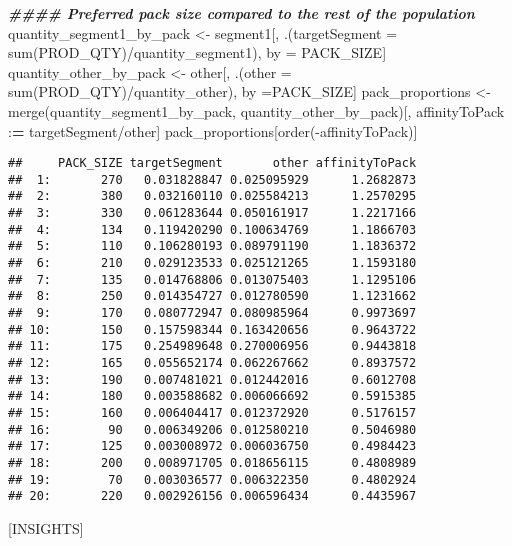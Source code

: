 \documentclass[
]{article}
\newenvironment{Shaded}{\begin{snugshade}}{\end{snugshade}}
\newcommand{\AttributeTok}[1]{\textcolor[rgb]{0.77,0.63,0.00}{#1}}
\newcommand{\DocumentationTok}[1]{\textcolor[rgb]{0.56,0.35,0.01}{\textbf{\textit{#1}}}}
\newcommand{\ErrorTok}[1]{\textcolor[rgb]{0.64,0.00,0.00}{\textbf{#1}}}
\newcommand{\FunctionTok}[1]{\textcolor[rgb]{0.00,0.00,0.00}{#1}}
\newcommand{\NormalTok}[1]{#1}
\newcommand{\OtherTok}[1]{\textcolor[rgb]{0.56,0.35,0.01}{#1}}
\newcommand{\SpecialCharTok}[1]{\textcolor[rgb]{0.00,0.00,0.00}{#1}}
\begin{document}
\begin{Shaded}
\begin{Highlighting}[]
\DocumentationTok{\#\#\#\# Preferred pack size compared to the rest of the population}
\NormalTok{quantity\_segment1\_by\_pack }\OtherTok{\textless{}{-}}\NormalTok{ segment1[, .(}\AttributeTok{targetSegment =} \FunctionTok{sum}\NormalTok{(PROD\_QTY)}\SpecialCharTok{/}\NormalTok{quantity\_segment1), by }\OtherTok{=}\NormalTok{ PACK\_SIZE]}
\NormalTok{quantity\_other\_by\_pack }\OtherTok{\textless{}{-}}\NormalTok{ other[, .(}\AttributeTok{other =} \FunctionTok{sum}\NormalTok{(PROD\_QTY)}\SpecialCharTok{/}\NormalTok{quantity\_other), by }\OtherTok{=}\NormalTok{PACK\_SIZE]}
\NormalTok{pack\_proportions }\OtherTok{\textless{}{-}} \FunctionTok{merge}\NormalTok{(quantity\_segment1\_by\_pack, quantity\_other\_by\_pack)[, affinityToPack }\SpecialCharTok{:}\ErrorTok{=}\NormalTok{ targetSegment}\SpecialCharTok{/}\NormalTok{other]}
\NormalTok{pack\_proportions[}\FunctionTok{order}\NormalTok{(}\SpecialCharTok{{-}}\NormalTok{affinityToPack)]}
\end{Highlighting}
\end{Shaded}

\begin{verbatim}
##     PACK_SIZE targetSegment       other affinityToPack
##  1:       270   0.031828847 0.025095929      1.2682873
##  2:       380   0.032160110 0.025584213      1.2570295
##  3:       330   0.061283644 0.050161917      1.2217166
##  4:       134   0.119420290 0.100634769      1.1866703
##  5:       110   0.106280193 0.089791190      1.1836372
##  6:       210   0.029123533 0.025121265      1.1593180
##  7:       135   0.014768806 0.013075403      1.1295106
##  8:       250   0.014354727 0.012780590      1.1231662
##  9:       170   0.080772947 0.080985964      0.9973697
## 10:       150   0.157598344 0.163420656      0.9643722
## 11:       175   0.254989648 0.270006956      0.9443818
## 12:       165   0.055652174 0.062267662      0.8937572
## 13:       190   0.007481021 0.012442016      0.6012708
## 14:       180   0.003588682 0.006066692      0.5915385
## 15:       160   0.006404417 0.012372920      0.5176157
## 16:        90   0.006349206 0.012580210      0.5046980
## 17:       125   0.003008972 0.006036750      0.4984423
## 18:       200   0.008971705 0.018656115      0.4808989
## 19:        70   0.003036577 0.006322350      0.4802924
## 20:       220   0.002926156 0.006596434      0.4435967
\end{verbatim}

{[}INSIGHTS{]}
\end{document}
